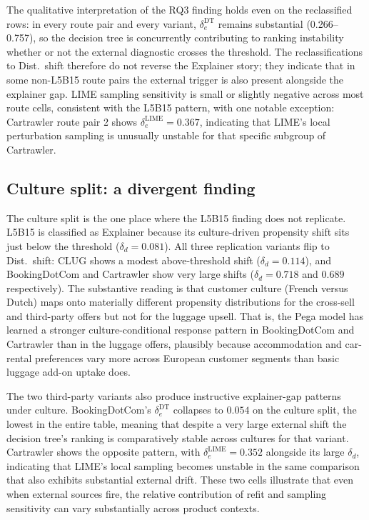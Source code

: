 \documentclass[oneside]{memoir} %
\begin{document}
The qualitative interpretation of the RQ3 finding holds even on the reclassified rows: in every route pair and every variant, $\delta_e^{\mathrm{DT}}$ remains substantial (0.266--0.757), so the decision tree is concurrently contributing to ranking instability whether or not the external diagnostic crosses the threshold. The reclassifications to Dist.\ shift therefore do not reverse the Explainer story; they indicate that in some non-L5B15 route pairs the external trigger is also present alongside the explainer gap. LIME sampling sensitivity is small or slightly negative across most route cells, consistent with the L5B15 pattern, with one notable exception: Cartrawler route pair 2 shows $\delta_e^{\mathrm{LIME}} = 0.367$, indicating that LIME's local perturbation sampling is unusually unstable for that specific subgroup of Cartrawler.

\subsection{Culture split: a divergent finding}

The culture split is the one place where the L5B15 finding does not replicate. L5B15 is classified as Explainer because its culture-driven propensity shift sits just below the threshold ($\delta_d = 0.081$). All three replication variants flip to Dist.\ shift: CLUG shows a modest above-threshold shift ($\delta_d = 0.114$), and BookingDotCom and Cartrawler show very large shifts ($\delta_d = 0.718$ and $0.689$ respectively). The substantive reading is that customer culture (French versus Dutch) maps onto materially different propensity distributions for the cross-sell and third-party offers but not for the luggage upsell. That is, the Pega model has learned a stronger culture-conditional response pattern in BookingDotCom and Cartrawler than in the luggage offers, plausibly because accommodation and car-rental preferences vary more across European customer segments than basic luggage add-on uptake does.

The two third-party variants also produce instructive explainer-gap patterns under culture. BookingDotCom's $\delta_e^{\mathrm{DT}}$ collapses to $0.054$ on the culture split, the lowest in the entire table, meaning that despite a very large external shift the decision tree's ranking is comparatively stable across cultures for that variant. Cartrawler shows the opposite pattern, with $\delta_e^{\mathrm{LIME}} = 0.352$ alongside its large $\delta_d$, indicating that LIME's local sampling becomes unstable in the same comparison that also exhibits substantial external drift. These two cells illustrate that even when external sources fire, the relative contribution of refit and sampling sensitivity can vary substantially across product contexts.
\end{document}
